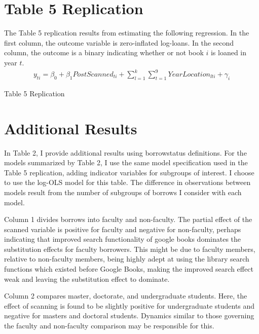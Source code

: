 \documentclass{article}
\begin{document}
\section*{Table 5 Replication}
The Table 5 replication results from estimating the following regression. In the first column, the outcome variable is zero-inflated log-loans. In the second column, the outcome is a binary indicating whether or not book $i$ is loaned in year $t$.
\begin{align}
y_{ti} = \beta_0 + \beta_1PostScanned_{ti} + \sum_{l=1}^k\sum_{t=1}^9{YearLocation_{lti}} + \gamma_i 
\end{align}

\begin{table}[htbp]
   \centering
   \caption{Table 5 Replication}
  
   \label{tab:booktabs}
\end{table}

\section*{Additional Results}
In Table 2, I provide additional results using borrowstatus definitions. For the models summarized by Table 2, I use the same model specification used in the Table 5 replication, adding indicator variables for subgroups of interest. I choose to use the log-OLS model for this table. The difference in observations between models result from the number of subgroups of borrows I consider with each model. 

Column 1 divides borrows into faculty and non-faculty. The partial effect of the scanned variable is positive for faculty and negative for non-faculty, perhaps indicating that improved search functionality of google books dominates the substitution effects for faculty borrowers. This might be due to faculty members, relative to non-faculty members, being highly adept at using the library search functions which existed before Google Books, making the improved search effect weak and leaving the substitution effect to dominate. 

Column 2 compares master, doctorate, and undergraduate students. Here, the effect of scanning is found to be slightly positive for undergraduate students and negative for masters and doctoral students. Dynamics similar to those governing the faculty and non-faculty comparison may be responsible for this. 
\end{document}
